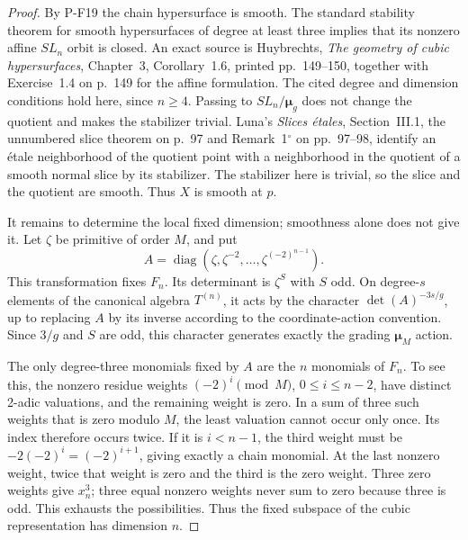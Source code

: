 \begin{proof}
By P-F19 the chain hypersurface is smooth. The standard
stability theorem for smooth hypersurfaces of degree at
least three implies that its nonzero affine $SL_n$ orbit
is closed. An exact source is Huybrechts, \emph{The geometry
of cubic hypersurfaces}, Chapter~3, Corollary~1.6, printed
pp.~149--150, together with Exercise~1.4 on p.~149 for the
affine formulation. The cited degree and dimension conditions
hold here, since $n\ge4$. Passing to $SL_n/\boldsymbol\mu_g$
does not change the quotient and makes the stabilizer trivial.
Luna's \emph{Slices \'etales}, Section~III.1, the unnumbered
slice theorem on p.~97 and Remark~1$^\circ$ on pp.~97--98, identify an
\'etale neighborhood of the quotient point with a neighborhood
in the quotient of a smooth normal slice by its stabilizer.
The stabilizer here is trivial, so the slice and the quotient
are smooth. Thus $X$ is smooth at $p$.

It remains to determine the local fixed dimension; smoothness
alone does not give it. Let $\zeta$ be primitive of order $M$,
and put
\[
 A=\operatorname{diag}
       (\zeta,\zeta^{-2},\ldots,\zeta^{(-2)^{n-1}}).
\]
This transformation fixes $F_n$. Its determinant is
$\zeta^S$ with $S$ odd. On degree-$s$ elements of the
canonical algebra $T^{(n)}$, it acts by the character
$\det(A)^{-3s/g}$, up to replacing $A$ by its inverse
according to the coordinate-action convention. Since
$3/g$ and $S$ are odd, this character generates exactly
the grading $\boldsymbol\mu_M$ action.

The only degree-three monomials fixed by $A$ are the $n$
monomials of $F_n$. To see this, the nonzero residue weights
$(-2)^i\pmod M$, $0\le i\le n-2$, have distinct
2-adic valuations, and the remaining weight is zero.
In a sum of three such weights that is zero modulo $M$,
the least valuation cannot occur only once. Its index
therefore occurs twice. If it is $i<n-1$, the third
weight must be $-2(-2)^i=(-2)^{i+1}$, giving exactly
a chain monomial. At the last nonzero weight, twice that
weight is zero and the third is the zero weight. Three
zero weights give $x_n^3$; three equal nonzero weights
never sum to zero because three is odd. This exhausts
the possibilities. Thus the fixed subspace of the cubic
representation has dimension $n$.


\end{proof}
